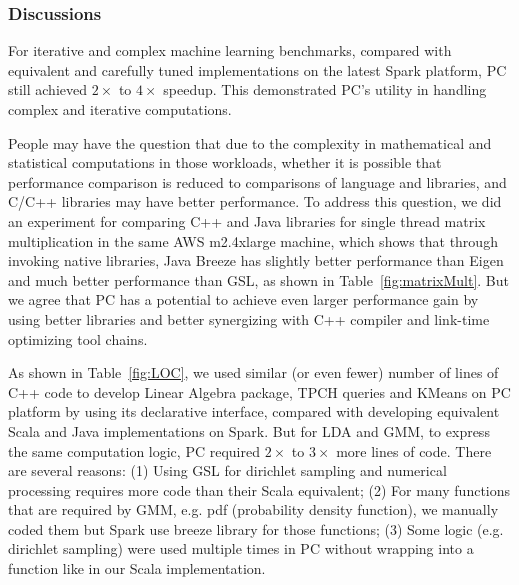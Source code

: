 \subsubsection{Discussions}
For iterative and complex machine learning
benchmarks, compared with equivalent and carefully tuned implementations on the latest
Spark platform, PC still achieved $2 \times$ to $4 \times$
speedup. This demonstrated PC's utility in handling
complex and iterative computations. 

\vspace{5pt}
People may have
the question that due to the complexity in mathematical and statistical
computations in those workloads, whether it is possible that performance comparison is reduced to comparisons of
language and libraries, and C/C++ libraries may have better
performance. To address this question, we did an experiment for
comparing C++ and Java libraries for
single thread matrix multiplication in the same AWS m2.4xlarge machine, which shows that through invoking
native libraries, Java Breeze has slightly better performance than Eigen and much
better performance than GSL, as shown in Table~\ref{fig:matrixMult}. But we agree that PC has a
potential to achieve even larger performance gain by using better
libraries and better
synergizing with C++ compiler and link-time optimizing tool chains.

\vspace{5pt}
As shown in Table~\ref{fig:LOC}, we used similar (or even fewer) number of lines of C++
code to develop Linear Algebra package, TPCH queries and KMeans on PC
platform by using
its declarative interface, compared with developing equivalent Scala
and Java implementations on Spark. But for LDA and GMM, to express the
same computation logic, PC required $2\times$ to $3\times$ more
lines of code. There are several reasons: (1) Using GSL for dirichlet
sampling and numerical processing requires more code than their Scala
equivalent; (2) For many functions that are required by GMM, e.g. pdf (probability
density function),  we manually coded them but Spark use breeze
library for those functions; (3) Some logic (e.g. dirichlet sampling) were used
multiple times in PC without wrapping into a function like in our
Scala implementation.




